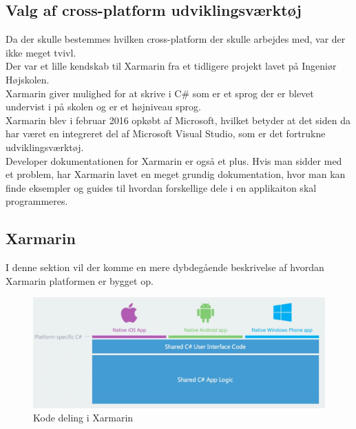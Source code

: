 \subsection{Valg af cross-platform udviklingsværktøj}
Da der skulle bestemmes hvilken cross-platform der skulle arbejdes med, var der ikke meget tvivl. \\
Der var et lille kendskab til Xarmarin fra et tidligere projekt lavet på Ingeniør Højskolen. \\
Xarmarin giver mulighed for at skrive i C\# som er et sprog der er blevet undervist i på skolen og er et højniveau sprog. \\
Xarmarin blev i februar 2016 opkøbt af Microsoft, hvilket betyder at det siden da har været en integreret del af Microsoft Visual Studio, som er det fortrukne udviklingsværktøj.\\
Developer dokumentationen for Xarmarin er også et plus. Hvis man sidder med et problem, har Xarmarin lavet en meget grundig dokumentation, hvor man kan finde eksempler og guides til hvordan forskellige dele i en applikaiton skal programmeres.

\subsection{Xarmarin}
I denne sektion vil der komme en mere dybdegående beskrivelse af hvordan Xarmarin platformen er bygget op.



\begin{figure}[H]
	\centering
	\includegraphics[width=1\linewidth]{Applikation/XarmarinShare.JPG}
	\caption{Kode deling i Xarmarin}
	\label{fig:CodeShare}
\end{figure}

\clearpage